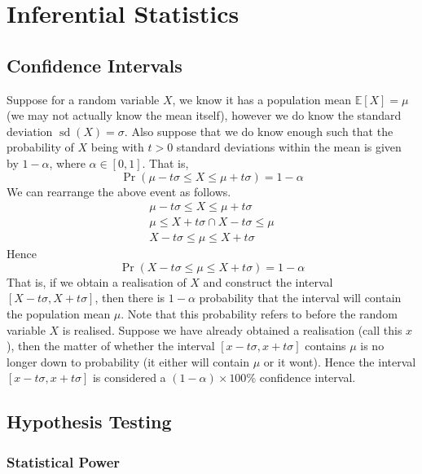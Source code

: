 \documentclass[11pt]{report} %
\begin{document}
\section{Inferential Statistics}

\subsection{Confidence Intervals}

Suppose for a random variable $X$, we know it has a population mean $\mathbb{E}\left[X\right] = \mu$ (we may not actually know the mean itself), however we do know the standard deviation $\operatorname{sd}\left(X\right) = \sigma$. Also suppose that we do know enough such that the probability of $X$ being with $t > 0$ standard deviations within the mean is given by $1 - \alpha$, where $\alpha \in \left[0, 1\right]$. That is,
\begin{equation}
\operatorname{Pr}\left(\mu - t\sigma \leq X \leq \mu + t\sigma\right) = 1 - \alpha
\end{equation}
We can rearrange the above event as follows.
\begin{gather}
\mu - t\sigma \leq X \leq \mu + t\sigma \\
\mu \leq X + t\sigma \cap X - t\sigma \leq \mu \\
X - t\sigma \leq \mu \leq X + t\sigma
\end{gather}
Hence
\begin{equation}
\operatorname{Pr}\left(X - t\sigma \leq \mu \leq X + t\sigma\right) = 1 - \alpha
\end{equation}
That is, if we obtain a realisation of $X$ and construct the interval $\left[X - t\sigma, X + t\sigma\right]$, then there is $1 - \alpha$ probability that the interval will contain the population mean $\mu$. Note that this probability refers to before the random variable $X$ is realised. Suppose we have already obtained a realisation (call this $x$), then the matter of whether the interval 
$\left[x - t\sigma, x + t\sigma\right]$ contains $\mu$ is no longer down to probability (it either will contain $\mu$ or it wont). Hence the interval $\left[x - t\sigma, x + t\sigma\right]$ is considered a $\left(1 - \alpha\right)\times 100\%$ confidence interval.

\subsection{Hypothesis Testing}

\subsubsection{Statistical Power}
\end{document}
